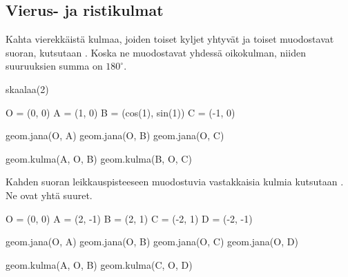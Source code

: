 \subsection*{Vierus- ja ristikulmat}
Kahta vierekkäistä kulmaa, joiden toiset kyljet yhtyvät ja toiset muodostavat suoran, kutsutaan . Koska ne muodostavat yhdessä oikokulman, niiden suuruuksien summa on $180^\circ$. 
\begin{center}
\begin{kuva}
	skaalaa(2)
	
	O = (0, 0)
	A = (1, 0)
	B = (cos(1), sin(1))
	C = (-1, 0)
	
	geom.jana(O, A)
	geom.jana(O, B)
	geom.jana(O, C)
	
	geom.kulma(A, O, B)
	geom.kulma(B, O, C)
\end{kuva}
\end{center}

Kahden suoran leikkauspisteeseen muodostuvia vastakkaisia kulmia kutsutaan . Ne ovat yhtä suuret.
\begin{center}
\begin{kuva}
	O = (0, 0)
	A = (2, -1)
	B = (2, 1)
	C = (-2, 1)
	D = (-2, -1)
	
	geom.jana(O, A)
	geom.jana(O, B)
	geom.jana(O, C)
	geom.jana(O, D)
	
	geom.kulma(A, O, B)
	geom.kulma(C, O, D)
\end{kuva}
\end{center}

